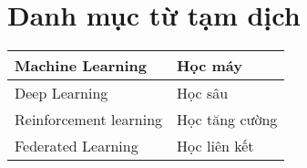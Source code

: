 \chapter*{\centering\Large{Danh mục từ tạm dịch}}
\begin{tabular}{| p{} |p{} |}
\hline
        Machine Learning &  Học máy\\
        \hline
        Deep Learning & Học sâu \\
        \hline
        Reinforcement learning & Học tăng cường \\
        \hline
        Federated Learning & Học liên kết\\
        \hline
\end{tabular} \\


